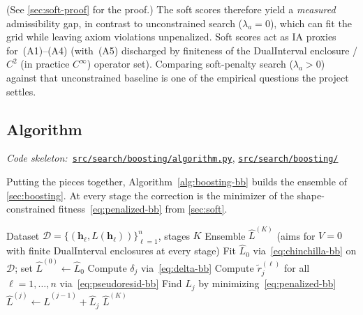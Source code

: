 \documentclass[11pt]{article}
\newcommand{\calD}{\mathcal{D}}
\newcommand{\Lhat}{\hat{L}}
\newcommand{\repoBlob}{https://github.com/krichelj/ByteBoost-Shape-Constrained-Boosted-SR/blob/main/}
\newcommand{\repoTree}{https://github.com/krichelj/ByteBoost-Shape-Constrained-Boosted-SR/tree/main/}
\newcommand{\pyFile}[1]{\href{\repoBlob#1}{\nolinkurl{#1}}}
\newcommand{\pyDir}[1]{\href{\repoTree#1}{\nolinkurl{#1/}}}
\newcommand{\codeRef}[1]{%
  \par\nobreak\noindent
  {\footnotesize\textit{Code skeleton:}~#1}\par\smallskip}
\theoremstyle{plain}
\theoremstyle{remark}
\begin{document}
(See \cref{sec:soft-proof} for the proof.)
The soft scores therefore yield a \emph{measured} admissibility gap, in contrast to unconstrained search ($\lambda_a=0$), which can fit the grid while leaving axiom violations unpenalized.
Soft scores act as IA proxies for~(A1)--(A4) (with~(A5) discharged by finiteness of the DualInterval enclosure / $C^2$ (in practice $C^\infty$) operator set).
Comparing soft-penalty search ($\lambda_a>0$) against that unconstrained baseline is one of the empirical questions the project settles.

\subsection{Algorithm}\label{sec:algorithm}
\codeRef{\pyFile{src/search/boosting/algorithm.py}, \pyDir{src/search/boosting}}
Putting the pieces together, Algorithm~\ref{alg:boosting-bb} builds the ensemble of \cref{sec:boosting}.
At every stage the correction is the minimizer of the shape-constrained fitness~\eqref{eq:penalized-bb} from \cref{sec:soft}.
\begin{algorithm}[H]
\caption{Shape-constrained boosted symbolic regression}
\label{alg:boosting-bb}
\begin{algorithmic}[1]
\Require Dataset $\calD = \{(\mathbf{h}_\ell, L(\mathbf{h}_\ell))\}_{\ell=1}^{n}$,
         stages $K$
\Ensure Ensemble $\Lhat^{(K)}$ (aims for $V=0$ with finite DualInterval enclosures at every stage)
\State Fit $\Lhat_0$ via~\eqref{eq:chinchilla-bb} on $\calD$;
       set $\Lhat^{(0)} \gets \Lhat_0$
    \State Compute $\delta_j$ via~\eqref{eq:delta-bb}
    \State Compute $\tilde{r}_j^{(\ell)}$ for all $\ell=1,\ldots,n$
           via~\eqref{eq:pseudoresid-bb}
    \State Find $\Lhat_j$ by minimizing~\eqref{eq:penalized-bb}
    \State $\Lhat^{(j)} \gets \Lhat^{(j-1)} + \Lhat_j$
\EndFor
\State \Return $\Lhat^{(K)}$
\end{algorithmic}
\end{algorithm}
\end{document}

